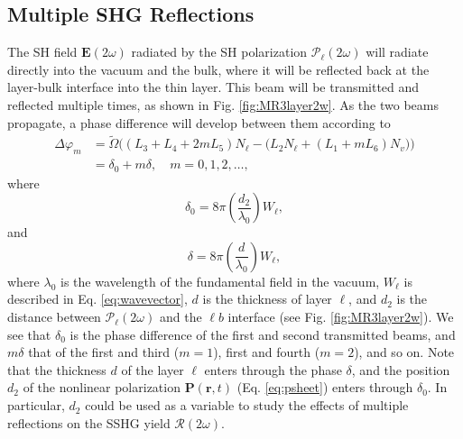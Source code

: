 \documentclass[aps,pra,10pt,amsmath,notitlepage,letterpaper]{revtex4-1}
\begin{document}

\subsection{Multiple SHG Reflections}

The SH field $\mathbf{E}(2\omega)$ radiated by the SH polarization
$\boldsymbol{\mathcal{P}}_{\ell}(2\omega)$ will radiate directly into the vacuum
and the bulk, where it will be reflected back at the layer-bulk interface into
the thin layer. This beam will be transmitted and reflected multiple times, as
shown in Fig. \ref{fig:MR3layer2w}. As the two beams propagate, a phase
difference will develop between them according to
\begin{equation}\label{eq:m99}
\begin{split}
\Delta\varphi_{m} 
&= \tilde{\Omega}
\Big(
(L_{3} + L_{4} + 2mL_{5})N_{\ell}
 - \big(L_{2}N_{\ell} + (L_{1} + mL_{6})N_{v}\big)
\Big)\\
&= \delta_{0} + m\delta,\quad m=0,1,2,\ldots,
\end{split}
\end{equation}
where
\begin{equation}\label{eq:delta0}
\delta_{0} =
8\pi\left(\frac{d_{2}}{\lambda_{0}}\right)W_{\ell},
\end{equation}
and
\begin{equation}\label{eq:delta}
\delta = 8\pi
\left(\frac{d}{\lambda_{0}}\right)W_{\ell},
\end{equation}
where $\lambda_{0}$ is the wavelength of the fundamental field in the vacuum,
$W_{\ell}$ is described in Eq. \eqref{eq:wavevector}, $d$ is the thickness of
layer $\ell$, and $d_{2}$ is the distance between
$\boldsymbol{\mathcal{P}}_{\ell}(2\omega)$ and the $\ell b$ interface (see Fig.
\ref{fig:MR3layer2w}). We see that $\delta_{0}$ is the phase difference of the
first and second transmitted beams, and $m\delta$ that of the first and third
($m = 1$), first and fourth ($m = 2$), and so on. Note that the thickness $d$ of
the layer $\ell$ enters through the phase $\delta$, and the position $d_{2}$ of
the nonlinear polarization $\mathbf{P}(\mathbf{r},t)$ (Eq. \eqref{eq:psheet})
enters through $\delta_{0}$. In particular, $d_{2}$ could be used as a variable
to study the effects of multiple reflections on the SSHG yield
$\mathcal{R}(2\omega)$.
\end{document}
